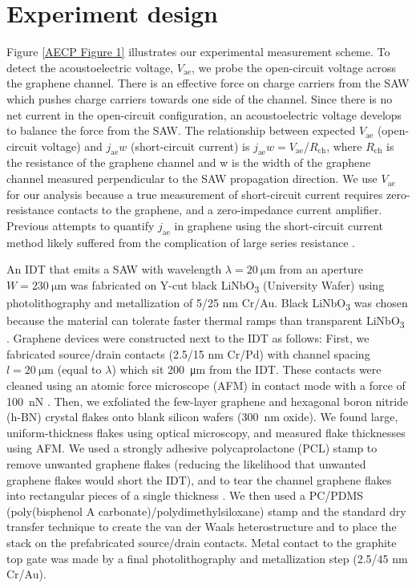 \documentclass[double,12pt,1in,seploa]{beavtex}
\let\Oldsection\section
\renewcommand{\section}{\FloatBarrier\Oldsection}
\begin{document}
\section{Experiment design} \label{charge pumping paper experiment design}
Figure \ref{AECP Figure 1} illustrates our experimental measurement scheme. To detect the acoustoelectric voltage, $V_{\mathrm{ae}}$, we probe the open-circuit voltage across the graphene channel. There is an effective force on charge carriers from the SAW which pushes charge carriers towards one side of the channel.  Since there is no net current in the open-circuit configuration, an acoustoelectric voltage develops to balance the force from the SAW. The relationship between expected $V_{\mathrm{ae}}$ (open-circuit voltage) and $j_{\mathrm{ae}}w$ (short-circuit current) is $j_{\mathrm{ae}}w = V_{\mathrm{ae}}$/$R_{\mathrm{ch}}$, where $R_{\mathrm{ch}}$ is the resistance of the graphene channel and w is the width of the graphene channel measured perpendicular to the SAW propagation direction. We use $V_{\mathrm{ae}}$ for our analysis because a true measurement of short-circuit current requires zero-resistance contacts to the graphene, and a zero-impedance current amplifier. Previous attempts to quantify $j_{\mathrm{ae}}$ in graphene using the short-circuit current method likely suffered from the complication of large series resistance \cite{bandhu_macroscopic_2013,bandhu_controlling_2016,okuda_acoustic_2016,tang_ultra-low_2017,okuda_graphene_2018}. 

An IDT that emits a SAW with wavelength $\lambda =  \SI{20}{\micro\meter}$ from an aperture $W = \SI{230}{\micro\meter}$ was fabricated on Y-cut black LiNbO\textsubscript{3} (University Wafer) using photolithography and metallization of 5/25 nm Cr/Au. Black LiNbO\textsubscript{3} was chosen because the material can tolerate faster thermal ramps than transparent LiNbO\textsubscript{3}  \cite{fang_quantum_2023,lane_flip-chip_2018}. Graphene devices were constructed next to the IDT as follows: First, we fabricated source/drain contacts (2.5/15 nm Cr/Pd) with channel spacing $l = \SI{20}{\micro\meter}$ (equal to $\lambda$) which sit \SI{200}{\micro\meter} from the IDT. These contacts were cleaned using an atomic force microscope (AFM) in contact mode with a force of \SI{100}{\nano\newton} \cite{goossens_mechanical_2012}. Then, we exfoliated the few-layer graphene and hexagonal boron nitride (h-BN) crystal flakes onto blank silicon wafers (\SI{300}{\nano\meter} oxide). We found large, uniform-thickness flakes using optical microscopy, and measured flake thicknesses using AFM. We used a strongly adhesive polycaprolactone (PCL) stamp to remove unwanted graphene flakes (reducing the likelihood that unwanted graphene flakes would short the IDT), and to tear the channel graphene flakes into rectangular pieces of a single thickness \cite{son_strongly_2020}. We then used a PC/PDMS (poly(bisphenol A carbonate)/polydimethylsiloxane) stamp and the standard dry transfer technique \cite{wang_one-dimensional_2013} to create the van der Waals heterostructure and to place the stack on the prefabricated source/drain contacts. Metal contact to the graphite top gate was made by a final photolithography and metallization step (2.5/45 nm Cr/Au).
\end{document}
